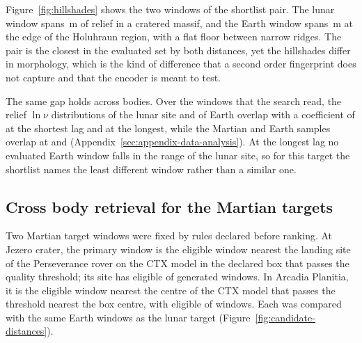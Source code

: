 Figure~\ref{fig:hillshades} shows the two windows of the shortlist pair. The lunar window spans
\HillMoonRelief\,m of relief in a cratered massif, and the Earth window spans \HillEarthRelief\,m
at the edge of the Holuhraun region, with a flat floor between narrow ridges. The pair is the closest
in the evaluated set by both distances, yet the hillshades differ in morphology, which is the kind
of difference that a second order fingerprint does not capture and that the encoder is meant to test.



The same gap holds across bodies. Over the windows that the search read, the relief $\ln \nu$ distributions of the lunar site and of Earth overlap with a coefficient of \OverlapEarthMoonNuShort{} at the shortest lag and \OverlapEarthMoonNuLong{} at the longest, while the Martian and Earth samples overlap at \OverlapEarthMarsNuShort{} and \OverlapEarthMarsNuLong{} (Appendix~\ref{sec:appendix-data-analysis}). At the longest lag no evaluated Earth window falls in the range of the lunar site, so for this target the shortlist names the least different window rather than a similar one.

\subsection{Cross body retrieval for the Martian targets}
\label{sec:results-mars}

Two Martian target windows were fixed by rules declared before ranking. At Jezero crater, the primary window is the eligible window nearest the landing site of the Perseverance rover on the CTX model in the declared box that passes the quality threshold; its site has \JezeroTargetEligible{} eligible of \JezeroTargetGenerated{} generated windows. In Arcadia Planitia, it is the eligible window nearest the centre of the CTX model that passes the threshold nearest the box centre, with \ArcadiaTargetEligible{} eligible of \ArcadiaTargetGenerated{} windows. Each was compared with the same \JezeroCompared{} Earth windows as the lunar target (Figure~\ref{fig:candidate-distances}).

